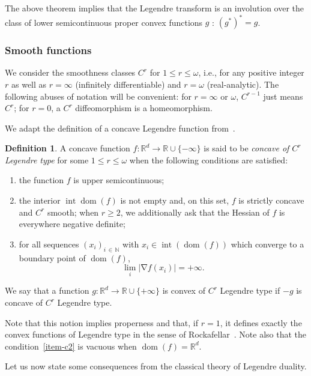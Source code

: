 \documentclass[10pt]{amsart}
\theoremstyle{definition}\newtheorem{defi}[theo]{Definition}\newtheorem{rema}[theo]{Remark}\newtheorem{exam}[theo]{Example}\newtheorem{exem}[theo]{Example}\newtheorem{nota}[theo]{Notation}
\theoremstyle{plain}
\theoremstyle{plain}
\newcommand\dom{\operatorname{dom}}
\newcommand\inter{\operatorname{int}}
\newcommand{\grad}{\operatorname{\nabla}}
\newcommand*\8{\infty}
\newcommand\NN{\mathbb{N}}
\newcommand\RR{\mathbb{R}}
\newcommand*{\romanenumi}{\renewcommand*{\theenumi}{\roman{enumi}}}
\begin{document}
The above theorem implies that the Legendre transform is an involution over the class of lower semicontinuous proper convex functions $g$ : $(g^*)^*=g$.


\subsubsection*{Smooth functions} 
We consider the smoothness classes $C^r$ for $1\leq r\leq\omega$, i.e., for any positive integer $r$ as well as $r=\infty$ (infinitely differentiable) and $r=\omega$ (real-analytic). The following abuses of notation will be convenient: for $r=\infty$ or $\omega$, $C^{r-1}$ just means $C^r$; for $r=0$, a $C^r$ diffeomorphism is a homeomorphism.

We adapt the definition of a concave Legendre function from~\cite[Chapitre~23]{Rockafellar-book}.

\begin{defi}\label{defi-Legendre}
A concave function $f:\RR^d\to\RR\cup\{-\infty\}$ is said to be \emph{concave of $C^r$ Legendre type} for some $1\leq r\leq\omega$ when the following conditions are satisfied:
\begin{enumerate}\romanenumi
\item\label{item-c0}
the function $f$ is upper semicontinuous;
\item\label{item-c1}
the interior $\inter\dom(f)$ is not empty and, on this set, $f$ is strictly concave and $C^r$ smooth; when $r\geq2$, we additionally ask that the Hessian of $f$ is everywhere negative definite;
\item\label{item-c2}
for all sequences $(x_i)_{i\,\in\,\NN}$ with $x_i\in\inter(\dom(f))$ which converge to a boundary point of $\dom(f)$,
\[
\lim_i \left\lvert \grad f(x_i) \right\rvert = +\infty.
\]
\end{enumerate}
We say that a function $g:\RR^d\to\RR\cup\{+\infty\}$ is convex of $C^r$ Legendre type if $-g$ is concave of $C^r$ Legendre type.
\end{defi}

Note that this notion implies properness and that, if $r=1$, it defines exactly the convex functions of Legendre type in the sense of Rockafellar~\cite[Chapitre~26]{Rockafellar-book}. Note also that the condition~\eqref{item-c2} is vacuous when $\dom(f)=\RR^d$.


Let us now state some consequences from the classical theory of Legendre duality.
\end{document}
